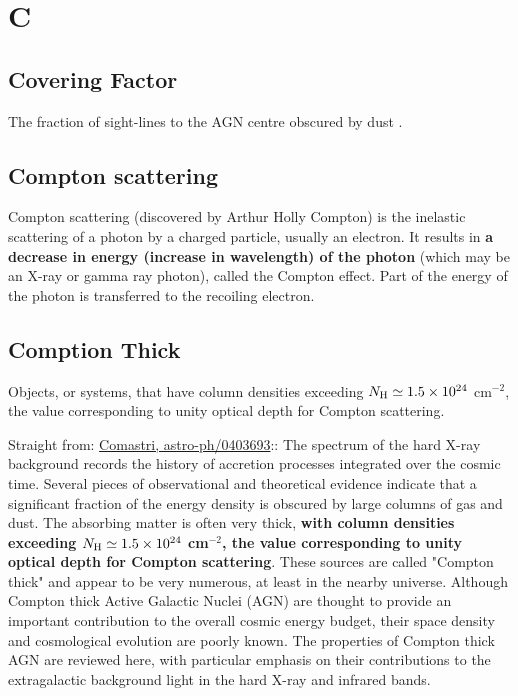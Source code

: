 \documentclass[11pt]{article}
\begin{document}
   

\section*{C}

\subsection*{Covering Factor}
The fraction of sight-lines to the AGN centre obscured by dust
\citep[e.g.,][]{Roseboom2013}.

\subsection*{Compton scattering} 
Compton scattering (discovered by Arthur Holly Compton) is the
inelastic scattering of a photon by a charged particle, usually an
electron. It results in {\bf a decrease in energy (increase in
wavelength) of the photon} (which may be an X-ray or gamma ray
photon), called the Compton effect. Part of the energy of the photon
is transferred to the recoiling electron. 

\subsection*{Comption Thick}
Objects, or systems, that have column densities exceeding $N_{\rm H}
\simeq 1.5 \times 10^{24}$ cm$^{-2}$, the value corresponding to unity
optical depth for Compton scattering.

Straight from: \href{http://ned.ipac.caltech.edu/level5/March04/Comastri/frames.html}{Comastri,  astro-ph/0403693}::
The spectrum of the hard X-ray background records the history of
accretion processes integrated over the cosmic time. Several pieces of
observational and theoretical evidence indicate that a significant
fraction of the energy density is obscured by large columns of gas and
dust. The absorbing matter is often very thick, {\bf with column
densities exceeding $N_{\rm H} \simeq 1.5 \times10^{24}$ cm$^{-2}$,
the value corresponding to unity optical depth for Compton
scattering}. These sources are called "Compton thick" and appear to be
very numerous, at least in the nearby universe. Although Compton thick
Active Galactic Nuclei (AGN) are thought to provide an important
contribution to the overall cosmic energy budget, their space density
and cosmological evolution are poorly known. The properties of Compton
thick AGN are reviewed here, with particular emphasis on their
contributions to the extragalactic background light in the hard X-ray
and infrared bands.
\end{document}

